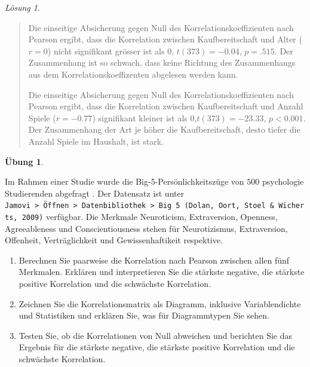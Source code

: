 \documentclass[
]{book}
\providecommand{\tightlist}{%
  \setlength{\itemsep}{0pt}\setlength{\parskip}{0pt}}
\theoremstyle{definition}
\theoremstyle{definition}
\theoremstyle{definition}
\newtheorem{exercise}{Übung}[chapter]
\theoremstyle{definition}
\theoremstyle{remark}
\newtheorem*{solution}{Lösung}
\begin{document}
\begin{solution}
\leavevmode

\begin{quote}
Die einseitige Absicherung gegen Null des Korrelationskoeffizienten nach Pearson ergibt, dass die Korrelation zwischen Kaufbereitschaft und Alter (\(r = 0\)) nicht signifikant grösser ist als \(0\), \(t(373) = -0.04\), \(p = .515\). Der Zusammenhang ist so schwach, dass keine Richtung des Zusammenhangs aus dem Korrelationskoeffizenten abgelesen werden kann.

Die einseitige Absicherung gegen Null des Korrelationskoeffizienten nach Pearson ergibt, dass die Korrelation zwischen Kaufbereitschaft und Anzahl Spiele (\(r = -0.77\)) signifikant kleiner ist als \(0\),\(t(373) = -23.33\), \(p < 0.001\). Der Zusammenhang der Art je höher die Kaufbereitschaft, desto tiefer die Anzahl Spiele im Haushalt, ist stark.
\end{quote}

\end{solution}

\begin{exercise}
\protect\hypertarget{exr:big-five-cor}{}\label{exr:big-five-cor}\leavevmode

Im Rahmen einer Studie wurde die Big-5-Persönlichkeitszüge von \(500\) psychologie Studierenden abgefragt \citep{dolan2009}. Der Datensatz ist unter \texttt{Jamovi\ \textgreater{}\ Öffnen\ \textgreater{}\ Datenbibliothek\ \textgreater{}\ Big\ 5\ (Dolan,\ Oort,\ Stoel\ \&\ Wicherts,\ 2009)} verfügbar. Die Merkmale Neuroticism, Extraversion, Openness, Agreeableness und Conscientiousness stehen für Neurotizismus, Extraversion, Offenheit, Verträglichkeit und Gewissenhaftikeit respektive.

\begin{enumerate}
\def\labelenumi{\alph{enumi})}
\tightlist
\item
  Berechnen Sie paarweise die Korrelation nach Pearson zwischen allen fünf Merkmalen. Erklären und interpretieren Sie die stärkste negative, die stärkste positive Korrelation und die schwächste Korrelation.
\item
  Zeichnen Sie die Korrelationsmatrix als Diagramm, inklusive Variablendichte und Statistiken und erklären Sie, was für Diagrammtypen Sie sehen.
\item
  Testen Sie, ob die Korrelationen von Null abweichen und berichten Sie das Ergebnis für die stärkste negative, die stärkste positive Korrelation und die schwächste Korrelation.
\end{enumerate}

\end{exercise}
\end{document}

